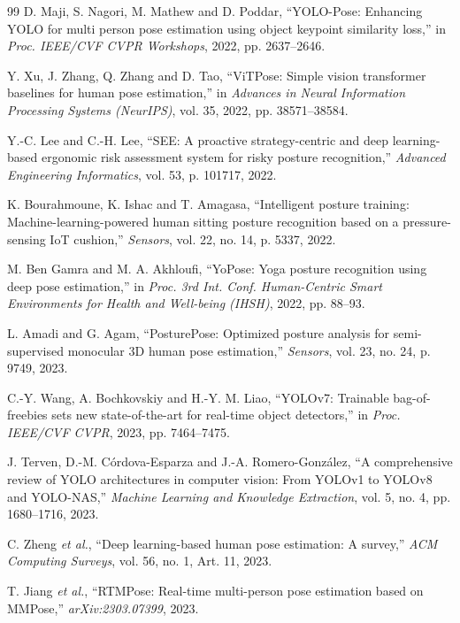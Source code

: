 ﻿\documentclass[12pt,a4paper]{article}
\begin{document}
\begin{thebibliography}{99}
D. Maji, S. Nagori, M. Mathew and D. Poddar, ``YOLO-Pose: Enhancing YOLO for multi person pose estimation using object keypoint similarity loss,'' in \textit{Proc. IEEE/CVF CVPR Workshops}, 2022, pp. 2637--2646.

Y. Xu, J. Zhang, Q. Zhang and D. Tao, ``ViTPose: Simple vision transformer baselines for human pose estimation,'' in \textit{Advances in Neural Information Processing Systems (NeurIPS)}, vol. 35, 2022, pp. 38571--38584.

Y.-C. Lee and C.-H. Lee, ``SEE: A proactive strategy-centric and deep learning-based ergonomic risk assessment system for risky posture recognition,'' \textit{Advanced Engineering Informatics}, vol. 53, p. 101717, 2022.

K. Bourahmoune, K. Ishac and T. Amagasa, ``Intelligent posture training: Machine-learning-powered human sitting posture recognition based on a pressure-sensing IoT cushion,'' \textit{Sensors}, vol. 22, no. 14, p. 5337, 2022.

M. Ben Gamra and M. A. Akhloufi, ``YoPose: Yoga posture recognition using deep pose estimation,'' in \textit{Proc. 3rd Int. Conf. Human-Centric Smart Environments for Health and Well-being (IHSH)}, 2022, pp. 88--93.

L. Amadi and G. Agam, ``PosturePose: Optimized posture analysis for semi-supervised monocular 3D human pose estimation,'' \textit{Sensors}, vol. 23, no. 24, p. 9749, 2023.

C.-Y. Wang, A. Bochkovskiy and H.-Y. M. Liao, ``YOLOv7: Trainable bag-of-freebies sets new state-of-the-art for real-time object detectors,'' in \textit{Proc. IEEE/CVF CVPR}, 2023, pp. 7464--7475.

J. Terven, D.-M. C\'ordova-Esparza and J.-A. Romero-Gonz\'alez, ``A comprehensive review of YOLO architectures in computer vision: From YOLOv1 to YOLOv8 and YOLO-NAS,'' \textit{Machine Learning and Knowledge Extraction}, vol. 5, no. 4, pp. 1680--1716, 2023.

C. Zheng \textit{et al.}, ``Deep learning-based human pose estimation: A survey,'' \textit{ACM Computing Surveys}, vol. 56, no. 1, Art. 11, 2023.

T. Jiang \textit{et al.}, ``RTMPose: Real-time multi-person pose estimation based on MMPose,'' \textit{arXiv:2303.07399}, 2023.


\end{thebibliography}
\end{document}
